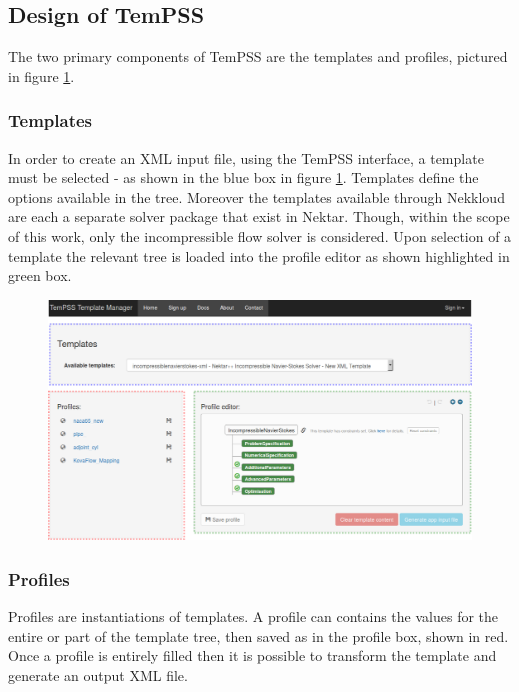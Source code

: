 \documentclass[11pt, a4paper]{report}
\begin{document}
\subsection{Design of TemPSS}
The two primary components of TemPSS are the templates and profiles, pictured in figure \ref{fig:TemPSS_interface}.

\subsubsection{Templates}
In order to create an XML input file, using the TemPSS interface, a template must be selected - as shown in the \textcolor{myblue}{blue box} in figure \ref{fig:TemPSS_interface}. Templates define the options available in the tree. Moreover the templates available through Nekkloud are each a separate solver package that exist in Nektar. Though, within the scope of this work, only the incompressible flow solver is considered. Upon selection of a template the relevant tree is loaded into the profile editor as shown highlighted in \textcolor{mygreen}{green box}. 

\begin{figure}[htb!]
 \centering
 \includegraphics[width=.85\linewidth,  clip=true, trim = 0cm 0cm 0cm 0cm]{TemPSS_interface}
 \label{fig:TemPSS_interface}
\end{figure}

\subsubsection{Profiles}
Profiles are instantiations of templates. A profile can contains the values for the entire or part of the template tree, then saved as in the profile box, shown in \textcolor{myred}{red}. Once a profile is entirely filled then it is possible to transform the template and generate an output XML file.
\end{document}
